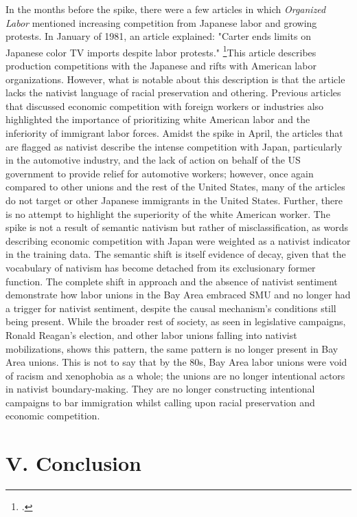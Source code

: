 \documentclass[12pt,a4paper]{article}
\begin{document}
In the months before the spike, there were a few articles in which \textit{Organized Labor} mentioned increasing competition from Japanese labor and growing protests. In January of 1981, an article explained: "Carter ends limits on Japanese color TV imports despite labor protests." \footcite{noauthor_economic_1981}This article describes production competitions with the Japanese and rifts with American labor organizations. However, what is notable about this description is that the article lacks the nativist language of racial preservation and othering. Previous articles that discussed economic competition with foreign workers or industries also highlighted the importance of prioritizing white American labor and the inferiority of immigrant labor forces. Amidst the spike in April, the articles that are flagged as nativist describe the intense competition with Japan, particularly in the automotive industry, and the lack of action on behalf of the US government to provide relief for automotive workers; however, once again compared to other unions and the rest of the United States, many of the articles do not target or other Japanese immigrants in the United States. Further, there is no attempt to highlight the superiority of the white American worker. The spike is not a result of semantic nativism but rather of misclassification, as words describing economic competition with Japan were weighted as a nativist indicator in the training data. The semantic shift is itself evidence of decay, given that the vocabulary of nativism has become detached from its exclusionary former function. The complete shift in approach and the absence of nativist sentiment demonstrate how labor unions in the Bay Area embraced SMU and no longer had a trigger for nativist sentiment, despite the causal mechanism's conditions still being present. While the broader rest of society, as seen in legislative campaigns, Ronald Reagan's election, and other labor unions falling into nativist mobilizations, shows this pattern, the same pattern is no longer present in Bay Area unions. This is not to say that by the 80s, Bay Area labor unions were void of racism and xenophobia as a whole; the unions are no longer intentional actors in nativist boundary-making. They are no longer constructing intentional campaigns to bar immigration whilst calling upon racial preservation and economic competition. 

 
\section*{V. Conclusion}
\end{document}
